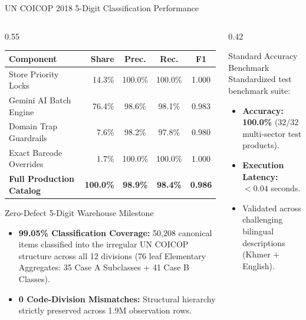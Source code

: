 \documentclass[aspectratio=169, 10pt]{beamer}
\begin{document}
\begin{frame}[shrink=8]{UN COICOP 2018 5-Digit Classification Performance}
  \begin{columns}
    \begin{column}{0.55\textwidth}
      \begin{table}[H]
        \centering
        \small
        \begin{tabular}{|l|r|c|c|c|}
          \hline
          \rowcolor{itcblue!20} \textbf{Component} & \textbf{Share} & \textbf{Prec.} & \textbf{Rec.} & \textbf{F1} \\ \hline
          Store Priority Locks & 14.3\% & 100.0\% & 100.0\% & 1.000 \\ \hline
          Gemini AI Batch Engine & 76.4\% & 98.6\% & 98.1\% & 0.983 \\ \hline
          Domain Trap Guardrails & 7.6\% & 98.2\% & 97.8\% & 0.980 \\ \hline
          Exact Barcode Overrides & 1.7\% & 100.0\% & 100.0\% & 1.000 \\ \hline
          \rowcolor{itcblue!15} \textbf{Full Production Catalog} & \textbf{100.0\%} & \textbf{98.9\%} & \textbf{98.4\%} & \textbf{0.986} \\ \hline
        \end{tabular}
      \end{table}

      \begin{block}{Zero-Defect 5-Digit Warehouse Milestone}
        \begin{itemize}
          \item \textbf{99.05\% Classification Coverage:} 50,208 canonical items classified into the irregular UN COICOP structure across all 12 divisions (76 leaf Elementary Aggregates: 35 Case A Subclasses + 41 Case B Classes).
          \item \textbf{0 Code-Division Mismatches:} Structural hierarchy strictly preserved across 1.9M observation rows.
        \end{itemize}
      \end{block}
    \end{column}

    \begin{column}{0.42\textwidth}
      \begin{exampleblock}{Standard Accuracy Benchmark}
        Standardized test benchmark suite:
        \begin{itemize}
          \item \textbf{Accuracy:} \textbf{100.0\%} ($32/32$ multi-sector test products).
          \item \textbf{Execution Latency:} $< 0.04$ seconds.
          \item Validated across challenging bilingual descriptions (Khmer + English).
        \end{itemize}
      \end{exampleblock}


\end{column}
\end{columns}
\end{frame}
\end{document}
